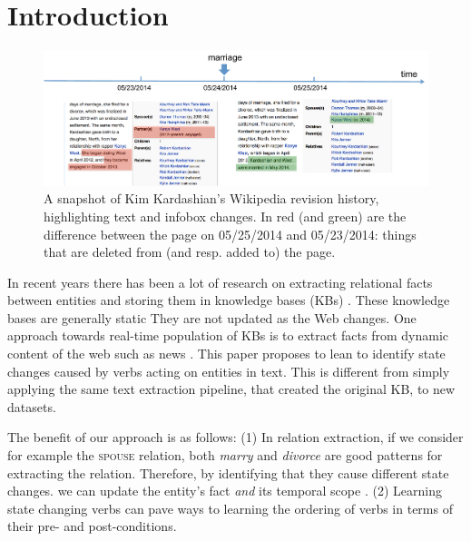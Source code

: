 \section{Introduction}

\begin{figure}[t]
\begin{center}
\includegraphics[width=16cm,keepaspectratio=true]{figures/motivation.pdf}
\caption{\label{fig:motivation} A snapshot of Kim Kardashian's Wikipedia revision history, highlighting text and infobox changes. In red (and green) are the difference between the page on 05/25/2014 and 05/23/2014: things that are deleted from (and resp. added to) the page.}
\end{center}
\end{figure}

In recent years there has been a lot of research on extracting relational facts between entities and storing them in knowledge bases (KBs) . These knowledge bases are generally static  \cite{suchanek2007yago,carlson2010toward,fader2011identifying,MitchellCHTBCMG15}
 They are not updated as the Web changes.
One approach towards real-time population of KBs is to extract facts from dynamic content of the web such as news \cite{nakashole2012real}. This paper proposes to lean to identify state changes caused by  verbs acting on entities in text. This is different from simply applying the same text extraction pipeline, that created the original KB, to new datasets.

The benefit of our approach is as follows: (1) In relation extraction, if we consider for example the \textsc{spouse} relation, both \textit{marry} and \textit{divorce} are good patterns for extracting the relation. Therefore, by identifying that they cause different state changes.
 we can update the entity's fact \textit{and} its temporal scope \cite{wijayactp}. (2) Learning state changing verbs
   can pave ways to learning the ordering of verbs in terms of their  pre- and post-conditions.
   
